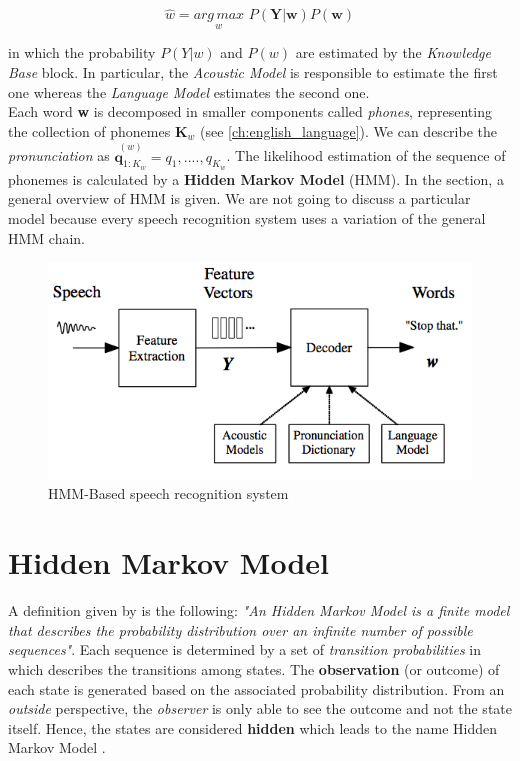 \begin{equation}
	\widehat{w} = \underset{w}{arg \, max} \,\, P (\textbf{Y}|\textbf{w}) P(\textbf{w})
\end{equation}

\noindent in which the probability $P(Y|w)$ and $P(w)$ are estimated by the \textit{Knowledge Base} block. In particular, the \textit{Acoustic Model} is responsible to estimate the first one whereas the \textit{Language Model} estimates the second one. \\
\noindent Each word \textbf{w} is decomposed in smaller components called \textit{phones}, representing the collection of phonemes $\textbf{K}_{w}$ (see \ref{ch:english_language}). We can describe the \textit{pronunciation} as $\overset{(w)}{\textbf{q}_{1:K_{w}}} = q_{1}, ...., q_{K_{w}}$. The likelihood estimation of the sequence of phonemes is calculated by a \textbf{Hidden Markov Model} (HMM). In the section, a general overview of HMM is given. We are not going to discuss a particular model because every speech recognition system uses a variation of the general HMM chain. \\

\begin{figure}[!ht]
	\centering
	\includegraphics[scale=0.8]{Figures/speech_Architecture.png}
	\caption{HMM-Based speech recognition system \cite{gales2008application}}
	\label{fig:speech_architecture}
\end{figure}

\section{Hidden Markov Model}
\label{sec:hmm}
\noindent A definition given by \cite{eddy1996hidden} is the following: \textit{"An Hidden Markov Model is a finite model that describes the probability distribution over an infinite number of possible sequences"}. Each sequence is determined by a set of \textit{transition probabilities} in which describes the transitions among states. The \textbf{observation} (or outcome) of each state is generated based on the associated probability distribution. From an \textit{outside} perspective, the \textit{observer} is only able to see the outcome and not the state itself. Hence, the states are considered \textbf{hidden} which leads to the name Hidden Markov Model \cite{def_hmm}. \\


